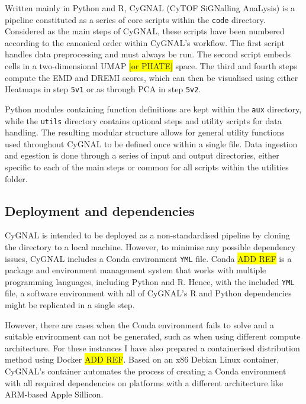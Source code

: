 Written mainly in Python and R, CyGNAL (CyTOF SiGNalling AnaLysis) is a pipeline constituted as a series of core scripts within the \texttt{code} directory. Considered as the main steps of CyGNAL, these scripts have been numbered according to the canonical order within CyGNAL's workflow. The first script handles data preprocessing and must always be run. The second script embeds cells in a two-dimensional UMAP \colorbox{yellow}{[or PHATE]} space. The third and fourth steps compute the EMD and DREMI scores, which can then be visualised using either Heatmaps in step \texttt{5v1} or as through PCA in step \texttt{5v2}.

Python modules containing function definitions are kept within the \texttt{aux} directory, while the \texttt{utils} directory contains optional steps and utility scripts for data handling. The resulting modular structure allows for general utility functions used throughout CyGNAL to be defined once within a single file. 
Data ingestion and egestion is done through a series of input and output directories, either specific to each of the main steps or common for all scripts within the utilities folder.


\newpage

\subsection{Deployment and dependencies}

CyGNAL is intended to be deployed as a non-standardised pipeline by cloning the directory to a local machine. However, to minimise any possible dependency issues, CyGNAL includes a Conda environment \texttt{YML} file. Conda \colorbox{yellow}{ADD REF} is a package and environment management system that works with multiple programming languages, including Python and R. Hence, with the included \texttt{YML} file, a software environment with all of CyGNAL's R and Python dependencies might be replicated in a single step.


However, there are cases when the Conda environment fails to solve and a suitable environment can not be generated, such as when using different compute architecture. For these instances I have also prepared a containerised distribution method using Docker \colorbox{yellow}{ADD REF}. Based on an x86 Debian Linux container, CyGNAL's container automates the process of creating a Conda environment with all required dependencies on platforms with a different architecture like ARM-based Apple Sillicon.

